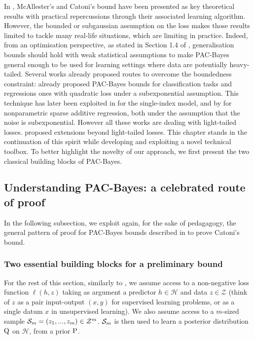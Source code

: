 In , McAllester's and Catoni's bound \citep{mcallester2003pac,catoni2007pac} have been presented as key theoretical results with practical repercussions through their associated learning algorithm. However, the bounded or subgaussian assumption on the loss makes those results limited to tackle many real-life situations, which are limiting in practice.
Indeed, from an optimisation perspective, as stated in Section 1.4 of , generalisation bounds should hold with weak statistical assumptions to make PAC-Bayes general enough to be used for learning settings where data are potentially heavy-tailed. Several works already proposed routes to overcome the boundedness constraint:  \citet[][Chapter 5]{catoni2004statistical} already proposed PAC-Bayes bounds for classification tasks and regressions ones with quadratic loss under a subexponential assumption. This technique has later been exploited in \citet{alquier2013sparse} for the single-index model, and by \citet{guedj2013pac} for nonparametric sparse additive regression, both under the assumption that the noise is subexponential. However all these works are dealing with light-tailed losses.
\citet{alquier2018simpler,holland2019pac, kuzborskij2019efron, haddouche2021pac} proposed extensions beyond light-tailed losses.
This chapter stands in the continuation of this spirit while developing and exploiting a novel technical toolbox.
To better highlight the novelty of our approach, we first present the two classical building blocks of PAC-Bayes.

\subsection{Understanding PAC-Bayes: a celebrated route of proof}
In the following subsection, we exploit again, for the sake of pedagagogy, the general pattern of proof for PAC-Bayes bounds described in  to prove Catoni's bound. 
\subsubsection{Two essential building blocks for a preliminary bound}

For the rest of this section, similarly to , we assume access to a non-negative loss function $\ell(h,z)$ taking as argument a predictor $h\in\mathcal{H}$  and data $z\in\mathcal{Z}$ (think of $z$ as a pair input-output $(x,y)$ for supervised learning problems, or as a single datum $x$ in unsupervised learning). We also assume access to a $m$-sized sample $\Sm= (z_1,...,z_m)\in\mathcal{Z}^m$. $\Sm$ is then used to learn a posterior distribution $\Q$ on $\mathcal{H}$, from a prior $\P$.

